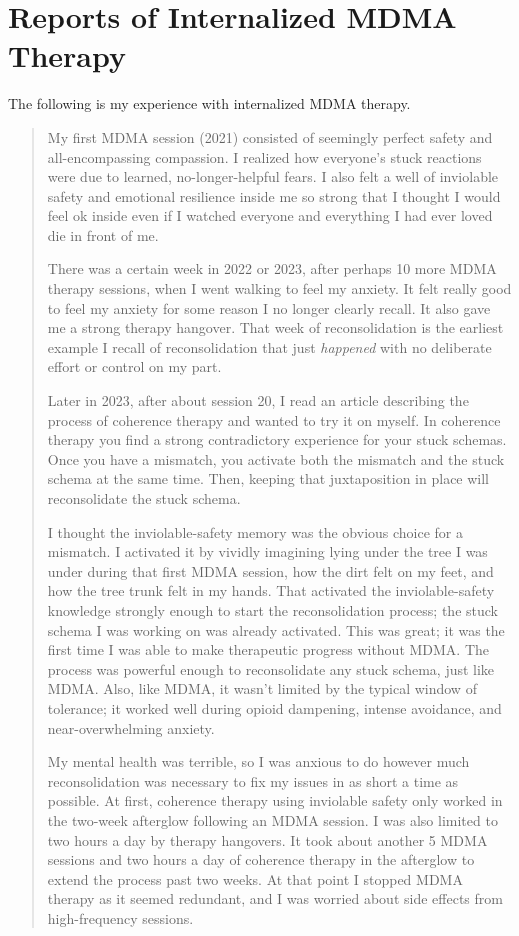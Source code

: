 \documentclass[11pt,oneside]{book}
\begin{document}
\chapter{Reports of Internalized MDMA Therapy}
\label{internalizedReports}
The following is my experience with internalized MDMA therapy.
\begin{quotation}
    My first MDMA session (2021) consisted of seemingly perfect safety and all-encompassing compassion. I realized how everyone's stuck reactions were due to learned, no-longer-helpful fears. I also felt a well of inviolable safety and emotional resilience inside me so strong that I thought I would feel ok inside even if I watched everyone and everything I had ever loved die in front of me. 
    
    There was a certain week in 2022 or 2023, after perhaps 10 more MDMA therapy sessions, when I went walking to feel my anxiety. It felt really good to feel my anxiety for some reason I no longer clearly recall. It also gave me a strong therapy hangover. That week of reconsolidation is the earliest example I recall of reconsolidation that just \textit{happened} with no deliberate effort or control on my part.

    Later in 2023, after about session 20, I read an article describing the process of coherence therapy and wanted to try it on myself. In coherence therapy you find a strong contradictory experience for your stuck schemas. Once you have a mismatch, you activate both the mismatch and the stuck schema at the same time. Then, keeping that juxtaposition in place will reconsolidate the stuck schema.
    
    I thought the inviolable-safety memory was the obvious choice for a mismatch. I activated it by vividly imagining lying under the tree I was under during that first MDMA session, how the dirt felt on my feet, and how the tree trunk felt in my hands. That activated the inviolable-safety knowledge strongly enough to start the reconsolidation process; the stuck schema I was working on was already activated. This was great; it was the first time I was able to make therapeutic progress without MDMA. The process was powerful enough to reconsolidate any stuck schema, just like MDMA. Also, like MDMA, it wasn't limited by the typical window of tolerance; it worked well during opioid dampening, intense avoidance, and near-overwhelming anxiety.
    
    My mental health was terrible, so I was anxious to do however much reconsolidation was necessary to fix my issues in as short a time as possible. At first, coherence therapy using inviolable safety only worked in the two-week afterglow following an MDMA session. I was also limited to two hours a day by therapy hangovers. It took about another 5 MDMA sessions and two hours a day of coherence therapy in the afterglow to extend the process past two weeks. At that point I stopped MDMA therapy as it seemed redundant, and I was worried about side effects from high-frequency sessions.


\end{quotation}
\end{document}
